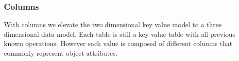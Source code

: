 \documentclass[12pt,openright,twoside]{report}
\begin{document}



\subsubsection{Columns}
With columns we elevate the two dimensional key value model to a three dimensional data model. 
Each table is still a key value table with all previous known operations. 
However each value is composed of different columns that commonly represent object attributes. 
\end{document}
